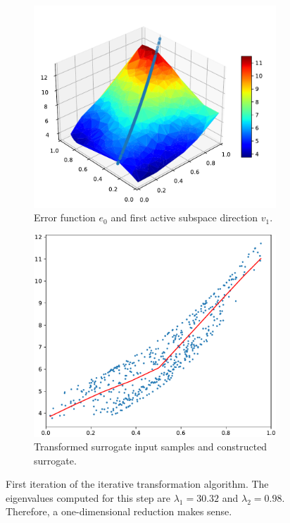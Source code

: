 \documentclass[
  a4paper,  %
  twoside,  %
  bibliography=totoc,
  headsepline,
  cleardoublepage=empty,
  parskip=half,
  draft=false
]{scrbook}
\begin{document}
\begin{figure}
\begin{subfigure}{.5\textwidth}
  \centering
  \includegraphics[width=.8\linewidth]{graphics/pipeline_current_1}
  \caption{Error function $e_0$ and first active subspace direction $v_1$.}
  \label{fig:as_rn}
\end{subfigure}%
\begin{subfigure}{.5\textwidth}
  \centering
  \includegraphics[width=.8\linewidth]{graphics/pipeline_local_1}
  \caption{Transformed surrogate input samples and constructed surrogate.}
  \label{fig:as_nn}
\end{subfigure}
\caption{First iteration of the iterative transformation algorithm. The eigenvalues computed for this step are $\lambda_1=30.32$ and $\lambda_2=0.98$. Therefore, a one-dimensional reduction makes sense.}
\label{fig:pipeline_1}
\end{figure}
\end{document}
